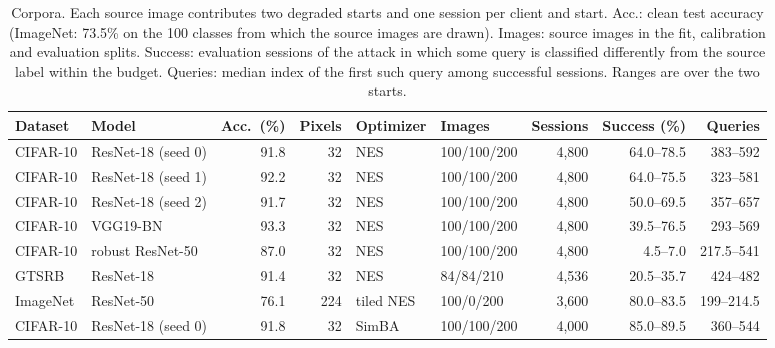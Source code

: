 \begin{table}[!tbp]
\centering\footnotesize\setlength{\tabcolsep}{4pt}
\caption{Corpora. Each source image contributes two degraded starts and one session per client and start. Acc.: clean test accuracy (ImageNet: 73.5\% on the 100 classes from which the source images are drawn). Images: source images in the fit, calibration and evaluation splits. Success: evaluation sessions of the attack in which some query is classified differently from the source label within the budget. Queries: median index of the first such query among successful sessions. Ranges are over the two starts.}
\label{tab:corpora}
\vspace{3pt}
\begin{adjustbox}{max width=\textwidth}
\begin{tabular}{llrrllrrr}
\toprule
Dataset & Model & Acc.\ (\%) & Pixels & Optimizer & Images & Sessions & Success (\%) & Queries \\
\midrule
CIFAR-10 & ResNet-18 (seed 0) & 91.8 & 32 & NES & 100/100/200 & 4{,}800 & 64.0--78.5 & 383--592 \\
CIFAR-10 & ResNet-18 (seed 1) & 92.2 & 32 & NES & 100/100/200 & 4{,}800 & 64.0--75.5 & 323--581 \\
CIFAR-10 & ResNet-18 (seed 2) & 91.7 & 32 & NES & 100/100/200 & 4{,}800 & 50.0--69.5 & 357--657 \\
CIFAR-10 & VGG19-BN & 93.3 & 32 & NES & 100/100/200 & 4{,}800 & 39.5--76.5 & 293--569 \\
CIFAR-10 & robust ResNet-50 & 87.0 & 32 & NES & 100/100/200 & 4{,}800 & 4.5--7.0 & 217.5--541 \\
GTSRB & ResNet-18 & 91.4 & 32 & NES & 84/84/210 & 4{,}536 & 20.5--35.7 & 424--482 \\
ImageNet & ResNet-50 & 76.1 & 224 & tiled NES & 100/0/200 & 3{,}600 & 80.0--83.5 & 199--214.5 \\
CIFAR-10 & ResNet-18 (seed 0) & 91.8 & 32 & SimBA & 100/100/200 & 4{,}000 & 85.0--89.5 & 360--544 \\
\bottomrule
\end{tabular}
\end{adjustbox}
\end{table}
